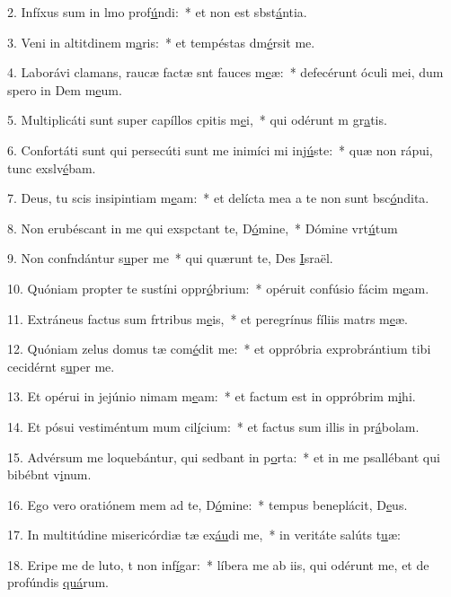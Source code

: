 2. Infíxus sum in lmo prof\uline{ú}ndi:~* et non est sbst\uline{á}ntia.\par 
3. Veni in altitdinem m\uline{a}ris:~* et tempéstas dm\uline{é}rsit me.\par 
4. Laborávi clamans, raucæ factæ snt fauces m\uline{e}æ:~* defecérunt óculi mei, dum spero in Dem m\uline{e}um.\par 
5. Multiplicáti sunt super capíllos cpitis m\uline{e}i,~* qui odérunt m gr\uline{a}tis.\par 
6. Confortáti sunt qui persecúti sunt me inimíci mi inj\uline{ú}ste:~* quæ non rápui, tunc exslv\uline{é}bam.\par 
7. Deus, tu scis insipintiam m\uline{e}am:~* et delícta mea a te non sunt bsc\uline{ó}ndita.\par 
8. Non erubéscant in me qui exspctant te, D\uline{ó}mine,~* Dómine vrt\uline{ú}tum\par 
9. Non confndántur s\uline{u}per me~* qui quærunt te, Des \uline{I}sraël.\par 
10. Quóniam propter te sustíni oppr\uline{ó}brium:~* opéruit confúsio fácim m\uline{e}am.\par 
11. Extráneus factus sum frtribus m\uline{e}is,~* et peregrínus fíliis matrs m\uline{e}æ.\par 
12. Quóniam zelus domus tæ com\uline{é}dit me:~* et oppróbria exprobrántium tibi cecidérnt s\uline{u}per me.\par 
13. Et opérui in jejúnio nimam m\uline{e}am:~* et factum est in oppróbrim m\uline{i}hi.\par 
14. Et pósui vestiméntum mum cil\uline{í}cium:~* et factus sum illis in pr\uline{á}bolam.\par 
15. Advérsum me loquebántur, qui sedbant in p\uline{o}rta:~* et in me psallébant qui bibébnt v\uline{i}num.\par 
16. Ego vero oratiónem mem ad te, D\uline{ó}mine:~* tempus beneplácit, D\uline{e}us.\par 
17. In multitúdine misericórdiæ tæ ex\uline{áu}di me,~* in veritáte salúts t\uline{u}æ:\par 
18. Eripe me de luto, t non inf\uline{í}gar:~* líbera me ab iis, qui odérunt me, et de profúndis \uline{quá}rum.\par 
